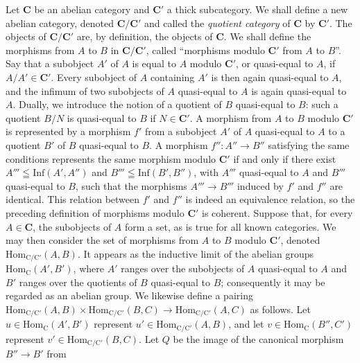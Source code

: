 Let $\mathbf{C}$ be an abelian category and $\mathbf{C}'$ a thick subcategory. We shall define a
new abelian category, denoted $\mathbf{C}/\mathbf{C}'$ and called the \textit{quotient category}
of $\mathbf{C}$ by $\mathbf{C}'$. The objects of $\mathbf{C}/\mathbf{C}'$ are, by definition, the objects of
$\mathbf{C}$. We shall define the morphisms from $A$ to $B$ in $\mathbf{C}/\mathbf{C}'$, called
``morphisms modulo $\mathbf{C}'$ from $A$ to $B$''.
Say that a subobject $A'$ of $A$ is equal to $A$ modulo $\mathbf{C}'$, or
quasi-equal to $A$, if $A/A'\in \mathbf{C}'$. Every subobject of $A$
containing $A'$ is then again quasi-equal to $A$, and the infimum of two
subobjects of $A$ quasi-equal to $A$ is again quasi-equal to $A$. Dually, we
introduce the notion of a quotient of $B$ quasi-equal to $B$: such a quotient
$B/N$ is quasi-equal to $B$ if $N\in \mathbf{C}'$.
A morphism from $A$ to $B$ modulo $\mathbf{C}'$ is represented by a morphism $f'$ from
a subobject $A'$ of $A$ quasi-equal to $A$ to a quotient $B'$ of $B$
quasi-equal to $B$. A morphism $f'':A''\to B''$ satisfying the
same conditions represents the same morphism modulo $\mathbf{C}'$ if and only if
there exist $A'''\leqq\mathrm{Inf}(A',A'')$ and
$B'''\leqq\mathrm{Inf}(B',B'')$, with $A'''$ quasi-equal to $A$ and $B'''$
quasi-equal to $B$, such that the morphisms $A'''\to B'''$
induced by $f'$ and $f''$ are identical. This relation between $f'$ and $f''$
is indeed an equivalence relation, so the preceding definition of morphisms
modulo $\mathbf{C}'$ is coherent.
Suppose that, for every $A\in \mathbf{C}$, the subobjects of $A$ form a set, as is true
for all known categories. We may then consider the set of morphisms from $A$
to $B$ modulo $\mathbf{C}'$, denoted $\mathrm{Hom}_{\mathrm{C}/\mathrm{C}'}(A,B)$. It appears as the
inductive limit of the abelian groups $\mathrm{Hom}_{\mathrm{C}}(A',B')$, where $A'$ ranges
over the subobjects of $A$ quasi-equal to $A$ and $B'$ ranges over the
quotients of $B$ quasi-equal to $B$; consequently it may be regarded as an
abelian group.
We likewise define a pairing
$\mathrm{Hom}_{\mathrm{C}/\mathrm{C}'}(A,B)\times\mathrm{Hom}_{\mathrm{C}/\mathrm{C}'}(B,C)  \to\mathrm{Hom}_{\mathrm{C}/\mathrm{C}'}(A,C)$ as follows. Let $u\in\mathrm{Hom}_{\mathrm{C}}(A',B')$ represent
$u'\in\mathrm{Hom}_{\mathrm{C}/\mathrm{C}'}(A,B)$, and let
$v\in\mathrm{Hom}_{\mathrm{C}}(B'',C')$ represent
$v'\in\mathrm{Hom}_{\mathrm{C}/\mathrm{C}'}(B,C)$. Let $Q$ be the image of the canonical
morphism $B''\to B'$ from

